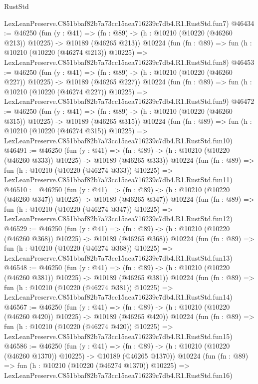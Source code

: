 \begin{lexlean}{RustStd}
\begin{coremodule}
    LexLeanPreserve.C851bbaf82b7a73cc15aea716239c7db4.R1.RustStd.fun7)
@46434 := @46250
    (fun (y : @41) =>
    (fn : @89) -> (h : @10210 (@10220 (@46260 @213)) @10225) -> @10189 (@46265 @213))
    @10224
    (fun (fn : @89) =>
    fun (h : @10210 (@10220 (@46274 @213)) @10225) =>
    LexLeanPreserve.C851bbaf82b7a73cc15aea716239c7db4.R1.RustStd.fun8)
@46453 := @46250
    (fun (y : @41) =>
    (fn : @89) -> (h : @10210 (@10220 (@46260 @227)) @10225) -> @10189 (@46265 @227))
    @10224
    (fun (fn : @89) =>
    fun (h : @10210 (@10220 (@46274 @227)) @10225) =>
    LexLeanPreserve.C851bbaf82b7a73cc15aea716239c7db4.R1.RustStd.fun9)
@46472 := @46250
    (fun (y : @41) =>
    (fn : @89) -> (h : @10210 (@10220 (@46260 @315)) @10225) -> @10189 (@46265 @315))
    @10224
    (fun (fn : @89) =>
    fun (h : @10210 (@10220 (@46274 @315)) @10225) =>
    LexLeanPreserve.C851bbaf82b7a73cc15aea716239c7db4.R1.RustStd.fun10)
@46491 := @46250
    (fun (y : @41) =>
    (fn : @89) -> (h : @10210 (@10220 (@46260 @333)) @10225) -> @10189 (@46265 @333))
    @10224
    (fun (fn : @89) =>
    fun (h : @10210 (@10220 (@46274 @333)) @10225) =>
    LexLeanPreserve.C851bbaf82b7a73cc15aea716239c7db4.R1.RustStd.fun11)
@46510 := @46250
    (fun (y : @41) =>
    (fn : @89) -> (h : @10210 (@10220 (@46260 @347)) @10225) -> @10189 (@46265 @347))
    @10224
    (fun (fn : @89) =>
    fun (h : @10210 (@10220 (@46274 @347)) @10225) =>
    LexLeanPreserve.C851bbaf82b7a73cc15aea716239c7db4.R1.RustStd.fun12)
@46529 := @46250
    (fun (y : @41) =>
    (fn : @89) -> (h : @10210 (@10220 (@46260 @368)) @10225) -> @10189 (@46265 @368))
    @10224
    (fun (fn : @89) =>
    fun (h : @10210 (@10220 (@46274 @368)) @10225) =>
    LexLeanPreserve.C851bbaf82b7a73cc15aea716239c7db4.R1.RustStd.fun13)
@46548 := @46250
    (fun (y : @41) =>
    (fn : @89) -> (h : @10210 (@10220 (@46260 @381)) @10225) -> @10189 (@46265 @381))
    @10224
    (fun (fn : @89) =>
    fun (h : @10210 (@10220 (@46274 @381)) @10225) =>
    LexLeanPreserve.C851bbaf82b7a73cc15aea716239c7db4.R1.RustStd.fun14)
@46567 := @46250
    (fun (y : @41) =>
    (fn : @89) -> (h : @10210 (@10220 (@46260 @420)) @10225) -> @10189 (@46265 @420))
    @10224
    (fun (fn : @89) =>
    fun (h : @10210 (@10220 (@46274 @420)) @10225) =>
    LexLeanPreserve.C851bbaf82b7a73cc15aea716239c7db4.R1.RustStd.fun15)
@46586 := @46250
    (fun (y : @41) =>
    (fn : @89) -> (h : @10210 (@10220 (@46260 @1370)) @10225) -> @10189 (@46265 @1370))
    @10224
    (fun (fn : @89) =>
    fun (h : @10210 (@10220 (@46274 @1370)) @10225) =>
    LexLeanPreserve.C851bbaf82b7a73cc15aea716239c7db4.R1.RustStd.fun16)

\end{coremodule}
\end{lexlean}

